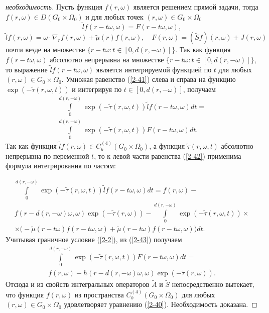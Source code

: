 \begin{proof}[необходимость]
Пусть функция $f(r,\omega)$ является решением прямой задачи, тогда
$f(r,\omega) \in D(G_0 \times \Omega_0)$ и для любых точек
$(r,\omega) \in G_0 \times \Omega_0$
\begin{equation}
    \label{2-41}
    \widetilde{l}f(r - t \omega , \omega)  = F(r - t \omega, \omega),
\end{equation}
\[
    \widetilde{l}f(r, \omega) = \omega \cdot \nabla_r f(r, \omega) +
    \widetilde{\mu} (r) f(r,\omega), \quad F(r, \omega) =
    (\widetilde{S}f)(r, \omega) + J(r, \omega)
\]
почти везде на множестве  $\{ r-t \omega  : t \in [0,d(r,-\omega)]
\}$. Так как функция $f(r - t \omega, \omega)$ абсолютно
непрерывна на множестве $\{ r - t \omega : t \in [0,d(r,-\omega)]
\}$, то выражение $\widetilde{l}f(r - t \omega , \omega)$ является
интегрируемой функцией по $t$ для любых $(r,\omega) \in G_0 \times
\Omega_0$. Умножая равенство (\ref{2-41}) слева и справа на
функцию $\exp(-\widetilde{\tau}(r,\omega,t))$ и интегрируя по $t
\in [0,d(r,-\omega)]$, получаем
\begin{multline}
    \label{2-42}
    \int \limits^{d(r,-\omega)}_{0} \exp (- \widetilde{\tau} (r,
    \omega,t)) \widetilde{l}f(r - t \omega, \omega) dt = \\ \int
    \limits^{d(r,-\omega)}_{0} \exp (- \widetilde{\tau} (r, \omega,t))
    F(r - t \omega, \omega)dt .
\end{multline}
Так как функция $\widetilde{l}f(r, \omega) \in C_b^{(4)}(G_0
\times \Omega_0)$, а функция $\widetilde{\tau}(r,\omega,t)$
абсолютно непрерывна по переменной $t$, то к левой части равенства
(\ref{2-42}) применима формула интегрирования по частям:

\begin{multline}
    \label{2-43}
    \int \limits^{d(r,-\omega)}_{0} \exp (- \widetilde{\tau} (r,
    \omega,t))\widetilde{l}f(r - t \omega, \omega) dt = f(r,\omega)
    -\\
    f(r - d(r,-\omega)\omega, \omega) \exp (-
    \widetilde{\tau}(r,\omega)) - \int \limits^{d(r,-\omega)}_{0} \exp
    (- \widetilde{\tau} (r, \omega,t))\times \\ \times \big(-
    \widetilde{\mu} (r - t \omega) f(r - t \omega , \omega) +
    \widetilde{\mu} (r - t \omega) f(r - t \omega, \omega)\big) dt .
\end{multline}
Учитывая граничное условие (\ref{2-2}), из (\ref{2-43}) получаем
\begin{multline*}
    \int \limits^{d(r,-\omega)}_{0} \exp (- \widetilde{\tau} (r,
    \omega,t))F(r - t \omega, \omega) dt =\\ f(r,\omega) - h(r -
    d(r,-\omega)\omega, \omega) \exp( - \widetilde{\tau} (r, \omega)).
\end{multline*}
Отсюда и из свойств интегральных операторов $\widetilde{A}$ и
$\widetilde{S}$ непосредственно вытекает, что функция
$f(r,\omega)$ из пространства $C_b^{(4)}(G_0 \times \Omega_0)$ для
любых $(r,\omega) \in G_0 \times \Omega_0$ удовлетворяет уравнению
(\ref{2-40}). Необходимость доказана.
\end{proof}

